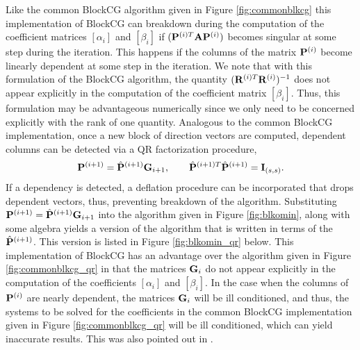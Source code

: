 \documentclass{article}
\newcommand{\bA}{{\bf A}}
\newcommand{\bG}{{\bf G}}
\newcommand{\bI}{{\bf I}}
\newcommand{\bP}{{\bf P}}
\newcommand{\bR}{{\bf R}}
\newcommand{\dm}{\begin{displaymath}}
\newcommand{\edm}{\end{displaymath}}
\begin{document}
Like the common BlockCG algorithm given in Figure
\ref{fig:commonblkcg} this implementation of BlockCG can breakdown
during the computation of the coefficient matrices $[\alpha_i]$
and $[\beta_i]$ if $(\bP^{(i)T} \bA \bP^{(i)})$ becomes singular
at some step during the iteration. This happens if the columns of
the matrix $\bP^{(i)}$ become linearly dependent at some step in
the iteration. We note that with this formulation of the BlockCG
algorithm, the quantity $(\bR^{(i)T} \bR^{(i)})^{-1}$ does not
appear explicitly in the computation of the coefficient matrix
$[\beta_i]$. Thus, this formulation may be advantageous
numerically since we only need to be concerned explicitly with the
rank of one quantity. Analogous to the common BlockCG
implementation, once a new block of direction vectors are
computed, dependent columns can be detected via a QR factorization
procedure,
  \dm
  \bP^{(i+1)} = {\hat \bP}^{(i+1)} \bG_{i+1}, \qquad {\hat
  \bP}^{(i+1)T} {\hat \bP}^{(i+1)} = \bI_{(s,s)}.
  \edm
If a dependency is detected, a deflation procedure can be
incorporated that drops dependent vectors, thus, preventing
breakdown of the algorithm. Substituting $\bP^{(i+1)} = {\hat
\bP}^{(i+1)} \bG_{i+1}$ into the algorithm given in Figure
\ref{fig:blkomin}, along with some algebra yields a version of the
algorithm that is written in terms of the ${\hat \bP}^{(i+1)}$.
This version is listed in Figure \ref{fig:blkomin_qr} below. This
implementation of BlockCG has an advantage over the algorithm
given in Figure \ref{fig:commonblkcg_qr} in that the matrices
$\bG_{i}$ do not appear explicitly in the computation of the
coefficients $[\alpha_i]$ and $[\beta_i]$. In the case when the
columns of $\bP^{(i)}$ are nearly dependent, the matrices
$\bG_{i}$ will be ill conditioned, and thus, the systems to be
solved for the coefficients in the common BlockCG implementation
given in Figure \ref{fig:commonblkcg_qr} will be ill conditioned,
which can yield inaccurate results. This was also pointed out in
\cite{DUB01}.
\end{document}
